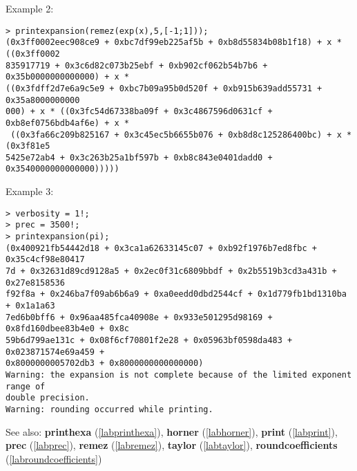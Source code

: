 \noindent Example 2: 
\begin{center}\begin{minipage}{15cm}\begin{Verbatim}[frame=single]
> printexpansion(remez(exp(x),5,[-1;1]));
(0x3ff0002eec908ce9 + 0xbc7df99eb225af5b + 0xb8d55834b08b1f18) + x * ((0x3ff0002
835917719 + 0x3c6d82c073b25ebf + 0xb902cf062b54b7b6 + 0x35b0000000000000) + x * 
((0x3fdff2d7e6a9c5e9 + 0xbc7b09a95b0d520f + 0xb915b639add55731 + 0x35a8000000000
000) + x * ((0x3fc54d67338ba09f + 0x3c4867596d0631cf + 0xb8ef0756bdb4af6e) + x *
 ((0x3fa66c209b825167 + 0x3c45ec5b6655b076 + 0xb8d8c125286400bc) + x * (0x3f81e5
5425e72ab4 + 0x3c263b25a1bf597b + 0xb8c843e0401dadd0 + 0x3540000000000000)))))
\end{Verbatim}
\end{minipage}\end{center}
\noindent Example 3: 
\begin{center}\begin{minipage}{15cm}\begin{Verbatim}[frame=single]
> verbosity = 1!;
> prec = 3500!;
> printexpansion(pi);
(0x400921fb54442d18 + 0x3ca1a62633145c07 + 0xb92f1976b7ed8fbc + 0x35c4cf98e80417
7d + 0x32631d89cd9128a5 + 0x2ec0f31c6809bbdf + 0x2b5519b3cd3a431b + 0x27e8158536
f92f8a + 0x246ba7f09ab6b6a9 + 0xa0eedd0dbd2544cf + 0x1d779fb1bd1310ba + 0x1a1a63
7ed6b0bff6 + 0x96aa485fca40908e + 0x933e501295d98169 + 0x8fd160dbee83b4e0 + 0x8c
59b6d799ae131c + 0x08f6cf70801f2e28 + 0x05963bf0598da483 + 0x023871574e69a459 + 
0x8000000005702db3 + 0x8000000000000000)
Warning: the expansion is not complete because of the limited exponent range of 
double precision.
Warning: rounding occurred while printing.
\end{Verbatim}
\end{minipage}\end{center}
See also: \textbf{printhexa} (\ref{labprinthexa}), \textbf{horner} (\ref{labhorner}), \textbf{print} (\ref{labprint}), \textbf{prec} (\ref{labprec}), \textbf{remez} (\ref{labremez}), \textbf{taylor} (\ref{labtaylor}), \textbf{roundcoefficients} (\ref{labroundcoefficients})
